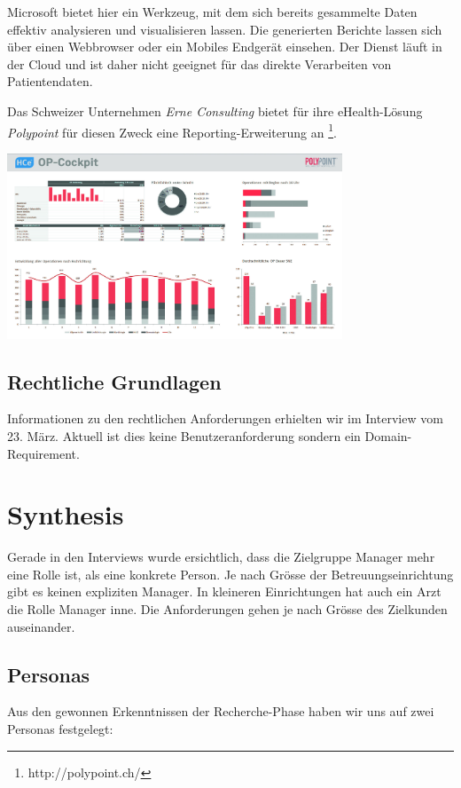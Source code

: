 \documentclass[a4paper]{scrreprt}
\begin{document}
Microsoft bietet hier ein Werkzeug, mit dem sich bereits gesammelte Daten effektiv analysieren und visualisieren lassen. Die generierten Berichte lassen sich über einen Webbrowser oder ein Mobiles Endgerät einsehen. Der Dienst läuft in der Cloud und ist daher nicht geeignet für das direkte Verarbeiten von Patientendaten.

\bigskip

Das Schweizer Unternehmen \textit{Erne Consulting} bietet für ihre eHealth-Lösung \textit{Polypoint} für diesen Zweck eine Reporting-Erweiterung an \footnote{http://polypoint.ch/}.

\includegraphics[width=0.75\textwidth]{img/research_polypoint_op-cockpit.jpg}



\subsection{Rechtliche Grundlagen}
Informationen zu den rechtlichen Anforderungen erhielten wir im Interview vom 23. März. Aktuell ist dies keine Benutzeranforderung sondern ein Domain-Requirement.

\pagebreak

\section{Synthesis}
Gerade in den Interviews wurde ersichtlich, dass die Zielgruppe Manager mehr eine Rolle ist, als eine konkrete Person. Je nach Grösse der Betreuungseinrichtung gibt es keinen expliziten Manager. In kleineren Einrichtungen hat auch ein Arzt die Rolle Manager inne.
Die Anforderungen gehen je nach Grösse des Zielkunden auseinander.

\subsection{Personas}
Aus den gewonnen Erkenntnissen der Recherche-Phase haben wir uns auf zwei Personas festgelegt:
\end{document}
